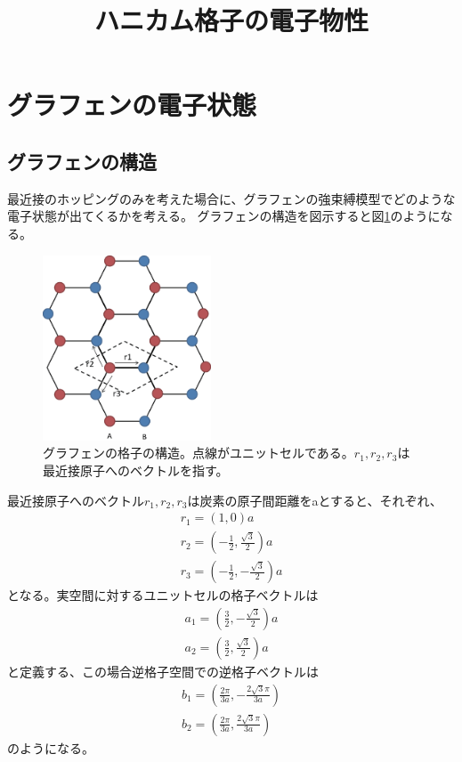 \documentclass{article}
\begin{document}
\title{ハニカム格子の電子物性}
\maketitle
\section{グラフェンの電子状態}
\subsection{グラフェンの構造}
最近接のホッピングのみを考えた場合に、グラフェンの強束縛模型でどのような電子状態が出てくるかを考える。
グラフェンの構造を図示すると図\ref{graphene}のようになる。


\begin{figure}[htbp]
\begin{center}
\includegraphics[width=5cm]{graphene.eps}
\end{center}
\label{graphene}
\caption{グラフェンの格子の構造。点線がユニットセルである。$r_1, r_2, r_3$は最近接原子へのベクトルを指す。}
\end{figure}


最近接原子へのベクトル$r_1, r_2, r_3$は炭素の原子間距離をaとすると、それぞれ、
\begin{eqnarray}
r_1=(1,0)a \\
r_2=(-\frac{1}{2}, \frac{\sqrt{3}}{2})a \\
r_3=(-\frac{1}{2}, -\frac{\sqrt{3}}{2})a
\end{eqnarray}
となる。実空間に対するユニットセルの格子ベクトルは
\begin{eqnarray}
a_1=(\frac{3}{2}, -\frac{\sqrt{3}}{2})a \\
a_2=(\frac{3}{2}, \frac{\sqrt{3}}{2})a
\end{eqnarray}
と定義する、この場合逆格子空間での逆格子ベクトルは
\begin{eqnarray}
b_1=(\frac{2\pi}{3a}, -\frac{2\sqrt{3}\pi}{3a}) \\
b_2=(\frac{2\pi}{3a}, \frac{2\sqrt{3}\pi}{3a})
\end{eqnarray}
のようになる。
\end{document}
